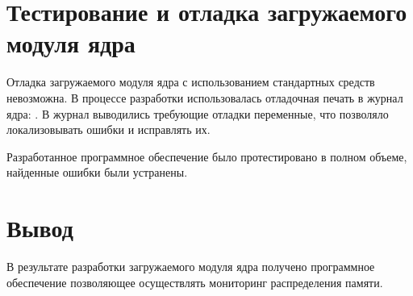 

\section{Тестирование и отладка загружаемого модуля ядра}

Отладка загружаемого модуля ядра с использованием стандартных средств невозможна. В процессе разработки использовалась отладочная печать в журнал ядра: . В журнал выводились требующие отладки переменные, что позволяло локализовывать ошибки и исправлять их.

Разработанное программное обеспечение было протестировано в полном объеме, найденные ошибки были устранены.

\section{Вывод}

В результате разработки загружаемого модуля ядра получено программное обеспечение позволяющее осуществлять мониторинг распределения памяти.